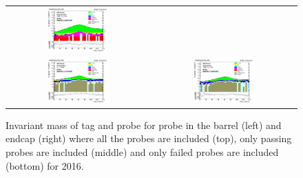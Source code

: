 \begin{figure}[htp]
\begin{center}
\begin{tabular}{cc}
      \includegraphics[width=0.45\textwidth]{figures/Zprime/2016/ScaleFactor/SameSign/nominal/stack_mee_Endcap_pass_PUW.png}\\
      \includegraphics[width=0.45\textwidth]{figures/Zprime/2016/ScaleFactor/SameSign/nominal/stack_mee_Barrel_fail_PUW.png} &
      \includegraphics[width=0.45\textwidth]{figures/Zprime/2016/ScaleFactor/SameSign/nominal/stack_mee_Endcap_fail_PUW.png}
    \end{tabular}
    \caption{Invariant mass of tag and probe for probe in the barrel (left) and endcap (right) where all the probes are included (top), only passing probes are included (middle) and only failed probes are included (bottom) for 2016.}
    \label{fig:SS_nominal_mee_2016}
  \end{center}
\end{figure}
